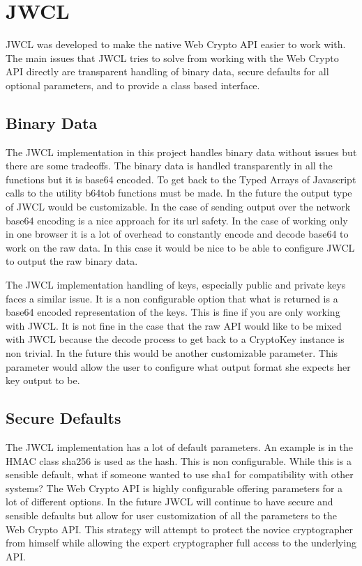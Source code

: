 \section{JWCL}


JWCL was developed to make the native Web Crypto API easier to work with. The main issues that JWCL tries to solve from working with the Web Crypto API directly are transparent handling of binary data, secure defaults for all optional parameters, and to provide a class based interface.


\subsection{Binary Data}


The JWCL implementation in this project handles binary data without issues but there are some tradeoffs. The binary data is handled transparently in all the functions but it is base64 encoded. To get back to the Typed Arrays of Javascript calls to the utility b64tob functions must be made. In the future the output type of JWCL would be customizable. In the case of sending output over the network base64 encoding is a nice approach for its url safety. In the case of working only in one browser it is a lot of overhead to constantly encode and decode base64 to work on the raw data. In this case it would be nice to be able to configure JWCL to output the raw binary data.


The JWCL implementation handling of keys, especially public and private keys faces a similar issue. It is a non configurable option that what is returned is a base64 encoded representation of the keys. This is fine if you are only working with JWCL. It is not fine in the case that the raw API would like to be mixed with JWCL because the decode process to get back to a CryptoKey instance is non trivial. In the future this would be another customizable parameter. This parameter would allow the user to configure what output format she expects her key output to be. 


\subsection{Secure Defaults}


The JWCL implementation has a lot of default parameters. An example is in the HMAC class sha256 is used as the hash. This is non configurable. While this is a sensible default, what if someone wanted to use sha1 for compatibility with other systems? The Web Crypto API is highly configurable offering parameters for a lot of different options. In the future JWCL will continue to have secure and sensible defaults but allow for user customization of all the parameters to the Web Crypto API. This strategy will attempt to protect the novice cryptographer from himself while allowing the expert cryptographer full access to the underlying API.


